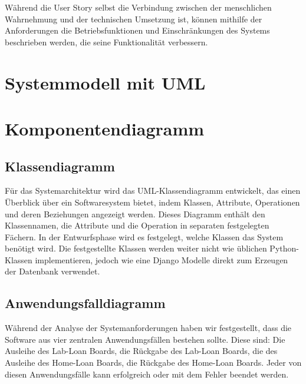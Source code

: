 Während die User Story selbst die Verbindung zwischen der menschlichen Wahrnehmung und der technischen Umsetzung ist, können mithilfe der Anforderungen die Betriebsfunktionen und Einschränkungen des Systems beschrieben werden, die seine Funktionalität verbessern.

\section{Systemmodell mit UML}
\label{sec:design:uml}

\section{Komponentendiagramm}
\label{sec:design:uml:uml_component}

\subsection{Klassendiagramm}
\label{sec:design:uml:class}
Für das Systemarchitektur wird das UML-Klassendiagramm entwickelt, das einen Überblick über ein Softwaresystem bietet, indem Klassen, Attribute, Operationen und deren Beziehungen angezeigt werden. Dieses Diagramm enthält den Klassennamen, die Attribute und die Operation in separaten festgelegten Fächern. In der Entwurfsphase wird es festgelegt, welche Klassen das System benötigt wird. Die festgestellte Klassen werden weiter nicht wie üblichen Python-Klassen implementieren, jedoch wie eine Django Modelle direkt zum Erzeugen der Datenbank verwendet. 

\subsection{Anwendungsfalldiagramm}
\label{sec:design:uml:use_cases}
Während der Analyse der Systemanforderungen haben wir festgestellt, dass die Software aus vier zentralen Anwendungsfällen bestehen sollte. Diese sind: Die Ausleihe des Lab-Loan Boards, die Rückgabe des Lab-Loan Boards, die des Ausleihe des Home-Loan Boards, die Rückgabe des Home-Loan Boards. Jeder von diesen Anwendungsfälle kann erfolgreich oder mit dem Fehler beendet werden.  

